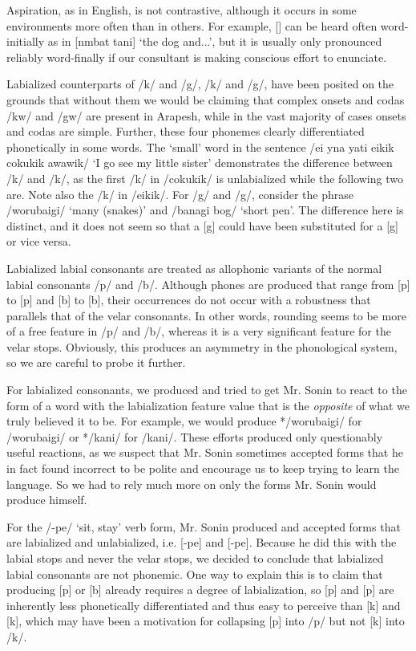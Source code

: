 \documentclass[pdftex,12pt,letterpaper]{article}
\let\ipa\textipa
\def\sw{\ipa{\super w}}
\begin{document}
 Aspiration, as in English, is not contrastive, although it occurs in some environments more often than in others. For example, [\ipa{t\super h}] can be heard often word-initially as in [n\ipa{1}mbat t\ipa{\super h}ani] `the dog and...', but it is usually only pronounced reliably word-finally if our consultant is making conscious effort to enunciate.
 
 Labialized counterparts of /k/ and /g/, /k\sw/ and /g\sw/, have been posited on the grounds that without them we would be claiming that complex onsets and codas /kw/ and /gw/ are present in Arapesh, while in the vast majority of cases onsets and codas are simple. Further, these four phonemes clearly differentiated phonetically in some words. The `small' word in the sentence /ei y\ipa{@}na yati eikik{\sw} cokuk\sw ik{\sw} awawik{\sw}/ `I go see my little sister' demonstrates the difference between /k/ and /k\sw/, as the first /k/ in /cokuk\sw ik\sw/ is unlabialized while the following two are. Note also the /k/ in /eikik\sw/. For /g/ and /g\sw/, consider the phrase /worubaig\sw i/ `many (snakes)' and /banagi bog/ `short pen'. The difference here is distinct, and it does not seem so that a [g\sw] could have been substituted for a [g] or vice versa.
 
 Labialized labial consonants are treated as allophonic variants of the normal labial consonants /p/ and /b/. Although phones are produced that range from [p] to [p\sw] and [b] to [b\sw], their occurrences do not occur with a robustness that parallels that of the velar consonants. In other words, rounding seems to be more of a free feature in /p/ and /b/, whereas it is a very significant feature for the velar stops. Obviously, this produces an asymmetry in the phonological system, so we are careful to probe it further.
 
 For labialized consonants, we produced and tried to get Mr. Sonin to react to the form of a word with the labialization feature value that is the \emph{opposite} of what we truly believed it to be. For example, we would produce */worubaigi/ for /worubaig\sw i/ or */kani/ for /k\sw ani/. These efforts produced only questionably useful reactions, as we suspect that Mr. Sonin sometimes accepted forms that he in fact found incorrect to be polite and encourage us to keep trying to learn the language. So we had to rely much more on only the forms Mr. Sonin would produce himself.
 
 For the /-pe/ `sit, stay' verb form, Mr. Sonin produced and accepted forms that are labialized and unlabialized, i.e. [-pe] and [-p\sw e]. Because he did this with the labial stops and never the velar stops, we decided to conclude that labialized labial consonants are not phonemic. One way to explain this is to claim that producing [p] or [b] already requires a degree of labialization, so [p] and [p\sw] are inherently less phonetically differentiated and thus easy to perceive than [k] and [k\sw], which may have been a motivation for collapsing [p\sw] into /p/ but not [k\sw] into /k/.
 
\end{document}
